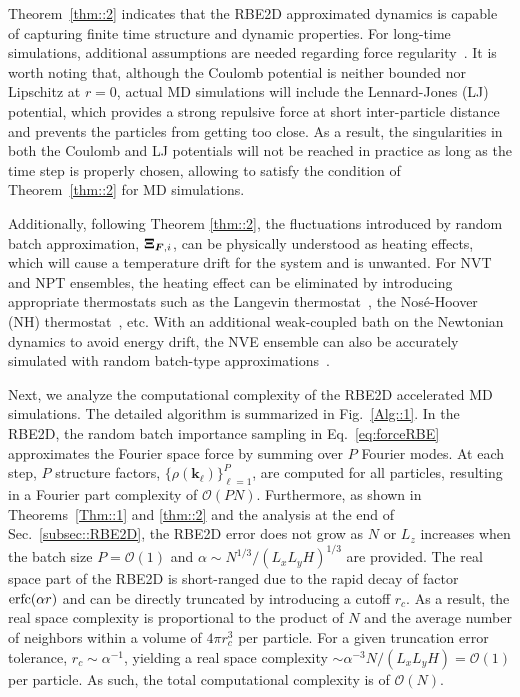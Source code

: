 Theorem~\ref{thm::2} indicates that the RBE2D approximated dynamics is capable of capturing finite time structure and dynamic properties.
For long-time simulations, additional assumptions are needed regarding force regularity~\cite{jin2022random}. 
It   {is worth} noting that, although the Coulomb potential is neither bounded nor Lipschitz at $r=0$, actual MD simulations will include the Lennard-Jones (LJ) potential, which provides a  {strong repulsive force at short inter-particle distance and prevents the particles from getting too close. As a result, the singularities in both the Coulomb and LJ potentials will not be reached in practice as long as the time step is properly chosen, allowing to satisfy the condition of Theorem~\ref{thm::2}  for MD simulations.}

Additionally, following Theorem \ref{thm::2}, the fluctuations introduced by random batch approximation, $\boldsymbol{\Xi}_{\boldsymbol{F},i}$,  can be physically understood as heating effects, which will cause a temperature drift for the system and is unwanted. 
For NVT and NPT ensembles, the heating effect can be eliminated by introducing appropriate thermostats such as the Langevin thermostat~\cite{feller1995constant}, the Nos\'e-Hoover (NH) thermostat~\cite{hoover1985canonical}, etc. With an additional weak-coupled bath on the Newtonian dynamics to avoid energy drift, the NVE ensemble can also be accurately simulated with random batch-type approximations~\cite{liang2024JCP}.

Next, we analyze the computational complexity of the RBE2D accelerated MD simulations. The detailed algorithm is summarized in Fig.~\ref{Alg::1}.  {In the RBE2D, the random batch importance sampling in Eq.~\eqref{eq:forceRBE} approximates the Fourier space force by summing over $P$ Fourier modes. At each step, $P$ structure factors, $\{\rho(\bm{k}_{\ell})\}_{\ell=1}^{P}$, are computed for all particles, resulting in a Fourier part complexity of $\mathcal{O}(PN)$. Furthermore, as shown in Theorems~\ref{Thm::1} and \ref{thm::2} and the analysis at the end of Sec.~\ref{subsec::RBE2D}, the RBE2D error does not grow as $N$ or $L_z$ increases when the batch size $P=\mathcal{O}(1)$ and $\alpha\sim N^{1/3}/(L_xL_yH)^{1/3}$ are provided. The real space part of the RBE2D is short-ranged due to the rapid decay of factor $\operatorname{erfc}(\alpha r)$ and can be directly truncated by introducing a cutoff $r_c$. As a result, the real space complexity is proportional to the product of $N$ and the average number of neighbors within a volume of $4\pi r_c^3$ per particle. For a given truncation error tolerance, $r_c\sim \alpha^{-1}$, yielding a real space complexity $\sim \alpha^{-3}N/(L_xL_yH)=\mathcal{O}(1)$ per particle. }As such, the total computational complexity is of $\mathcal{O}(N)$. 

